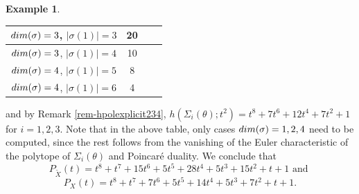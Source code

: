 \documentclass[11pt, reqno]{amsart}
\theoremstyle{plain}
\theoremstyle{definition}
\newtheorem{example}[theorem]{Example}
\theoremstyle{remark}
\begin{document}
\begin{example}
\begin{center}
\begin{tabular}{|c|c|l|r|}
\hline 
${\rm dim}(\sigma) = 3$, $|\sigma(1)| = 3$ & 20 \\  
\hline
 ${\rm dim}(\sigma) = 3$, $|\sigma(1)| = 4$ & 10\\ 
\hline 
 ${\rm dim}(\sigma) = 4$, $|\sigma(1)| = 5$  & 8\\ 
\hline 
 ${\rm dim}(\sigma) = 4$, $|\sigma(1)| = 6$  & 4\\ 
\hline 
\end{tabular}
\end{center}
and by Remark \ref{rem-hpolexplicit234}, $h(\Sigma_{i}(\theta);t^{2}) =  t^{8} + 7t^{6} + 12t^{4} +7t^{2} +1$ for $i=1,2,3$. Note that
in the above table, only cases ${\rm dim}(\sigma) =  1,2,4$ need to be computed, since the rest follows from the vanishing of the Euler characteristic of the polytope of $\Sigma_{i}(\theta)$ and  Poincar\'e duality.
We conclude that
$$P_{\widetilde{X}}(t)  = t^{8} +t^{7} +15t^{6} + 5t^{5} +28t^{4} + 5t^{3} +15t^{2} +t + 1 \text{ and }$$
$$P_{X}(t)  = t^{8} +t^{7} +7t^{6} + 5t^{5} +14t^{4} + 5t^{3} +7t^{2} +t + 1.$$
\end{example}
\end{document}
